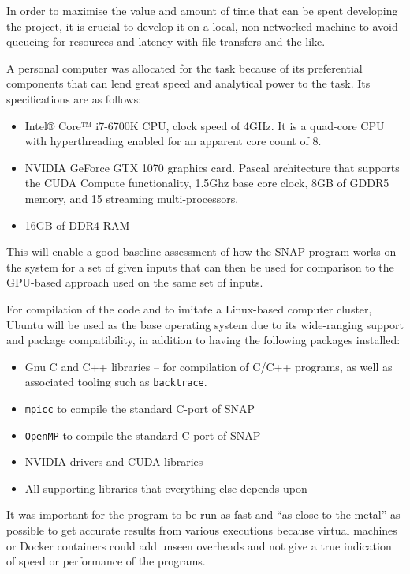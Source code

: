 \documentclass[conference]{IEEEtran}
\begin{document}
In order to maximise the value and amount of time that can be spent developing the project, it is crucial to develop it on a local, non-networked machine to avoid queueing for resources and latency with file transfers and the like.

A personal computer was allocated for the task because of its preferential components that can lend great speed and analytical power to the task. Its specifications are as follows:

\begin{itemize}
\item Intel® Core™ i7-6700K CPU, clock speed of 4GHz. It is a quad-core CPU with hyperthreading enabled for an apparent core count of 8.
\item NVIDIA GeForce GTX 1070 graphics card. Pascal architecture that supports the CUDA Compute functionality, 1.5Ghz base core clock, 8GB of GDDR5 memory, and 15 streaming multi-processors.
\item 16GB of DDR4 RAM
\end{itemize}

This will enable a good baseline assessment of how the SNAP program works on the system for a set of given inputs that can then be used for comparison to the GPU-based approach used on the same set of inputs.

For compilation of the code and to imitate a Linux-based computer cluster, Ubuntu will be used as the base operating system due to its wide-ranging support and package compatibility, in addition to having the following packages installed:

\begin{itemize}
\item Gnu C and C++ libraries – for compilation of C/C++ programs, as well as associated tooling such as \texttt{backtrace}.
\item \texttt{mpicc} to compile the standard C-port of SNAP
\item \texttt{OpenMP} to compile the standard C-port of SNAP
\item NVIDIA drivers and CUDA libraries
\item All supporting libraries that everything else depends upon
\end{itemize}

It was important for the program to be run as fast and ``as close to the metal” as possible to get accurate results from various executions because virtual machines or Docker containers could add unseen overheads and not give a true indication of speed or performance of the programs.
\end{document}
